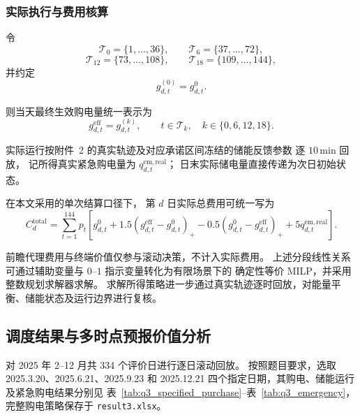 \documentclass[zihao=-4,a4paper,UTF8,fontset=none]{ctexart}
\begin{document}
\subsubsection{实际执行与费用核算}

令
\[
\mathcal T_0=\{1,\ldots,36\},\qquad
\mathcal T_6=\{37,\ldots,72\},
\]
\[
\mathcal T_{12}=\{73,\ldots,108\},\qquad
\mathcal T_{18}=\{109,\ldots,144\},
\]
并约定
\[
g_{d,t}^{(0)}
=
g_{d,t}^{0}.
\]

则当天最终生效购电量统一表示为
\begin{equation}
g_{d,t}^{\mathrm{eff}}
=
g_{d,t}^{(k)},
\qquad
t\in\mathcal T_k,
\quad
k\in\{0,6,12,18\}.
\label{eq:q3_effective_purchase}
\end{equation}

实际运行按附件~2 的真实轨迹及对应承诺区间冻结的储能反馈参数
逐 $10\,\mathrm{min}$ 回放，
记所得真实紧急购电量为
$q_{d,t}^{\mathrm{em,real}}$；
日末实际储电量直接传递为次日初始状态。

在本文采用的单次结算口径下，
第 $d$ 日实际总费用可统一写为
\begin{equation}
C_d^{\mathrm{total}}
=
\sum_{t=1}^{144}
p_t
\left[
g_{d,t}^{0}
+
1.5
\left(
g_{d,t}^{\mathrm{eff}}
-
g_{d,t}^{0}
\right)_+
-
0.5
\left(
g_{d,t}^{0}
-
g_{d,t}^{\mathrm{eff}}
\right)_+
+
5q_{d,t}^{\mathrm{em,real}}
\right].
\label{eq:q3_actual_total_cost}
\end{equation}

前瞻代理费用与终端价值仅参与滚动决策，不计入实际费用。
上述分段线性关系可通过辅助变量与 $0$--$1$ 指示变量转化为有限场景下的
确定性等价 MILP，并采用整数规划求解器求解。
求解所得策略进一步通过真实轨迹逐时回放，对能量平衡、储能状态及运行边界进行复核。

\subsection{调度结果与多时点预报价值分析}

对 2025 年 2--12 月共 334 个评价日进行逐日滚动回放。
按照题目要求，选取 2025.3.20、2025.6.21、2025.9.23 和
2025.12.21 四个指定日期，其购电、储能运行及紧急购电结果分别见
表~\ref{tab:q3_specified_purchase}--表~\ref{tab:q3_emergency}，
完整购电策略保存于 \texttt{result3.xlsx}。
\end{document}
